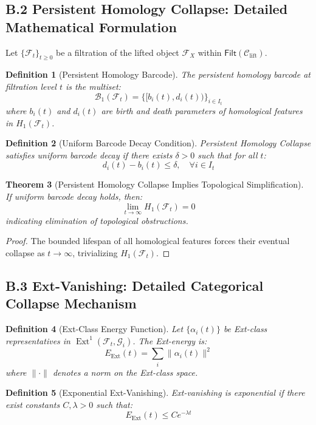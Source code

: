 \documentclass[11pt]{article}
\newtheorem{theorem}{Theorem}[section]
\newtheorem{definition}[theorem]{Definition}
\DeclareMathOperator{\Ext}{Ext}
\begin{document}
\subsection*{B.2 Persistent Homology Collapse: Detailed Mathematical Formulation}

Let $\{\mathcal{F}_t\}_{t \geq 0}$ be a filtration of the lifted object $\mathcal{F}_X$ within $\mathsf{Filt}(\mathcal{C}_{\mathrm{lift}})$.

\begin{definition}[Persistent Homology Barcode]
The persistent homology barcode at filtration level $t$ is the multiset:
\[
\mathcal{B}_1(\mathcal{F}_t) = \{ [b_i(t), d_i(t)) \}_{i \in I_t}
\]
where $b_i(t)$ and $d_i(t)$ are birth and death parameters of homological features in $H_1(\mathcal{F}_t)$.
\end{definition}

\begin{definition}[Uniform Barcode Decay Condition]
Persistent Homology Collapse satisfies uniform barcode decay if there exists $\delta > 0$ such that for all $t$:
\[
d_i(t) - b_i(t) \leq \delta, \quad \forall i \in I_t
\]
\end{definition}

\begin{theorem}[Persistent Homology Collapse Implies Topological Simplification]
If uniform barcode decay holds, then:
\[
\lim_{t \to \infty} H_1(\mathcal{F}_t) = 0
\]
indicating elimination of topological obstructions.
\end{theorem}

\begin{proof}
The bounded lifespan of all homological features forces their eventual collapse as $t \to \infty$, trivializing $H_1(\mathcal{F}_t)$.
\end{proof}

\subsection*{B.3 Ext-Vanishing: Detailed Categorical Collapse Mechanism}

\begin{definition}[Ext-Class Energy Function]
Let $\{\alpha_i(t)\}$ be Ext-class representatives in $\Ext^1(\mathcal{F}_t, \mathcal{G}_i)$. The Ext-energy is:
\[
E_{\mathrm{Ext}}(t) = \sum_{i} \| \alpha_i(t) \|^2
\]
where $\|\cdot\|$ denotes a norm on the Ext-class space.
\end{definition}

\begin{definition}[Exponential Ext-Vanishing]
Ext-vanishing is exponential if there exist constants $C, \lambda > 0$ such that:
\[
E_{\mathrm{Ext}}(t) \leq C e^{-\lambda t}
\]
\end{definition}
\end{document}

